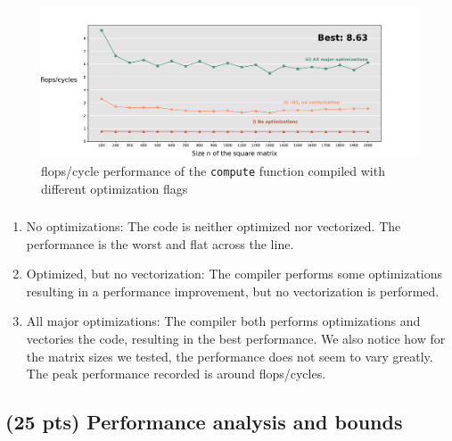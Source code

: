 \documentclass[tikz,14pt,fleqn]{article}
\begin{document}
\subsubsection{} %
\begin{figure}[H]
    \vspace*{-0.7cm}
    \includegraphics[width=\linewidth]{../out/ex2c.pdf}
    \caption{flops/cycle performance of the \texttt{compute} function compiled with different optimization flags}
\end{figure}


\subsubsection{} %
\begin{enumerate}
    \item No optimizations: The code is neither optimized nor vectorized. The performance is the worst and flat across the line.
    \item Optimized, but no vectorization: The compiler performs some optimizations resulting in a performance improvement, but no vectorization is performed.
    \item All major optimizations: The compiler both performs optimizations and vectories the code, resulting in the best performance. We also notice how for the matrix sizes we tested, the performance does not seem to vary greatly. The peak performance recorded is around  flops/cycles.
\end{enumerate}

\subsection{(25 pts) Performance analysis and bounds}
\subsubsection{} %
\end{document}
